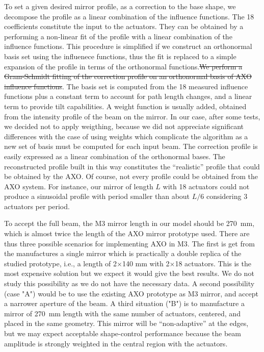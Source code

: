 \documentclass{iucr}
\newcommand{\inblue}[1]{{\color{blue}#1}}
\newcommand{\replace}[2]{{\color{blue}#1}{\color{blue}\sout{#2}}}
\begin{document}
To set a given desired mirror profile, as a correction to the base shape, we decompose the profile as a linear combination of the influence functions. The 18 coefficients constitute the input to the actuators. \replace{They can be obtained by a performing a non-linear fit of the profile with a linear combination of the influence functions. This procedure is simplified if we construct an orthonormal basis set using the influenece functions, thus the fit is replaced to a simple expansion of the profile in terms of the orthonormal functions.}{We perform a Gram-Schmidt fitting of the correction profile on an orthonormal basis of AXO influence functions}. The basis \replace{set}{} is computed from the 18 measured influence functions plus a constant term to account for path length changes, and a linear term to provide tilt capabilities. \replace{A weight function is usually added, obtained from the intensity profile of the beam on the mirror. In our case, after some tests, we decided not to apply weigthing, because we did not appreciate significant differences with the case of using weights which complicate the algorithm as a new set of basis must be computed for each input beam.}{} The correction profile is easily expressed as a linear combination of the orthonormal bases. The reconstructed profile built in this way constitutes the ``realistic'' profile that could be obtained by the AXO. Of course, not every profile could be obtained from the AXO system. For instance, our mirror of length $L$ with 18 actuators could not produce a sinusoidal profile with period smaller than about $L/6$ considering 3 actuators per period.

To accept the full beam, the M3 mirror length in our model should be 270~mm, which is almost twice the length of the AXO mirror prototype used. There are thus three possible scenarios for implementing AXO in M3. The first is get from the manufactures a single mirror which is practically a double replica of the studied prototype, i.e., a length of 2$\times$140 mm with 2$\times$18 actuators. This is the most expensive solution but we expect it would give the best results. We do not study this possibility as we do not have the necessary data. \inblue{A second possibility (case "A") would be to use the existing AXO prototype as M3 mirror, and accept a narrower aperture of the beam. A third situation ("B") is to manufacture a mirror of 270~mm length with the same number of actuators, centered, and placed in the same geometry. This mirror will be ``non-adaptive'' at the edges, but we may expect acceptable shape-control performance because the beam amplitude is strongly weighted in the central region with the actuators.}
\end{document}
